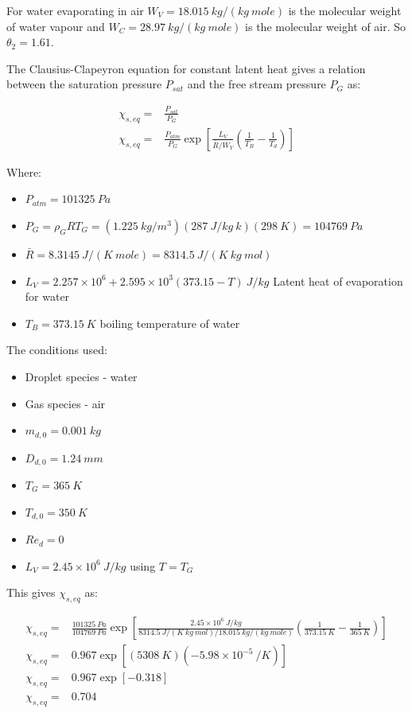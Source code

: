 \documentclass[../Interim_Report_Master]{subfiles}
\begin{document}
For water evaporating in air $W_V=18.015~kg/(kg~mole)$ is the molecular weight of water vapour and $W_C=28.97~kg/(kg~mole)$ is the molecular weight of air. So $\theta_2=1.61$.

The Clausius-Clapeyron equation for constant latent heat gives a relation between the saturation pressure $P_{sat}$ and the free stream pressure $P_G$ as:

\begin{subequations}
\begin{align}
\chi_{s,eq} =& \frac{P_{sat}}{P_G} \\
\chi_{s,eq} =& \frac{P_{atm}}{P_G}\exp \left[\frac{L_V}{\bar{R}/W_V}\left(\frac{1}{T_B}-\frac{1}{T_d}\right)\right] 
\end{align}
\end{subequations}

Where:
\begin{multicols}{2}
\begin{itemize}
	\item $P_{atm}=101325~Pa$
	\item $P_G=\rho_G RT_G=(1.225~kg/m^3)(287~J/kg~k)(298~K)=104769~Pa$
	\item $\bar{R}=8.3145~J/(K~mole)=8314.5~J/(K~kg~mol)$
	\item $L_V=2.257\times10^6+2.595\times10^3(373.15-T)~J/kg$ Latent heat of evaporation for water
	\item $T_B=373.15~K$ boiling temperature of water
\end{itemize}
\end{multicols}

The conditions used:

\begin{multicols}{2}
\begin{itemize}
	\item Droplet species - water
	\item Gas species - air
	\item $m_{d,0}=0.001~kg$
	\item $D_{d,0}=1.24~mm$
	\item $T_G=365~K$
	\item $T_{d,0}=350~K$
	\item $Re_d=0$
	\item $L_V=2.45\times10^6~J/kg$  using $T=T_G$
\end{itemize}
\end{multicols}

This gives $\chi_{s,eq}$ as:

\begin{subequations}
\begin{align}
\chi_{s,eq} =& \frac{101325~Pa}{104769~Pa}\exp \left[\frac{2.45\times10^6~J/kg}{8314.5~J/(K~kg~mol)/18.015~kg/(kg~mole)}\left(\frac{1}{373.15~K}-\frac{1}{365~K}\right)\right] \\
\chi_{s,eq} =& 0.967\exp \left[(5308~K )(-5.98\times 10^{-5}~/K)\right] \\
\chi_{s,eq} =& 0.967\exp [-0.318] \\
\chi_{s,eq} =& 0.704
\end{align}
\end{subequations}
\end{document}
